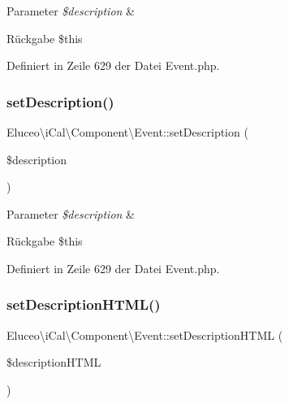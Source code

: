 \begin{DoxyParams}{Parameter}
{\em \$description} & \\
\hline
\end{DoxyParams}
\begin{DoxyReturn}{Rückgabe}
\$this 
\end{DoxyReturn}


Definiert in Zeile 629 der Datei Event.\+php.

\mbox{\label{class_eluceo_1_1i_cal_1_1_component_1_1_event_a508fb1d58b995b1864d8b02102ae3a93}} 
\subsubsection{\texorpdfstring{set\+Description()}{setDescription()}\hspace{0.1cm}{\footnotesize\ttfamily [3/3]}}
{\footnotesize\ttfamily Eluceo\textbackslash{}i\+Cal\textbackslash{}\+Component\textbackslash{}\+Event\+::set\+Description (\begin{DoxyParamCaption}\item[{}]{\$description }\end{DoxyParamCaption})}


\begin{DoxyParams}{Parameter}
{\em \$description} & \\
\hline
\end{DoxyParams}
\begin{DoxyReturn}{Rückgabe}
\$this 
\end{DoxyReturn}


Definiert in Zeile 629 der Datei Event.\+php.

\mbox{\label{class_eluceo_1_1i_cal_1_1_component_1_1_event_a82490c5b0b85400e224ccf51fbc322ff}} 
\subsubsection{\texorpdfstring{set\+Description\+H\+T\+M\+L()}{setDescriptionHTML()}\hspace{0.1cm}{\footnotesize\ttfamily [1/3]}}
{\footnotesize\ttfamily Eluceo\textbackslash{}i\+Cal\textbackslash{}\+Component\textbackslash{}\+Event\+::set\+Description\+H\+T\+ML (\begin{DoxyParamCaption}\item[{}]{\$description\+H\+T\+ML }\end{DoxyParamCaption})}


